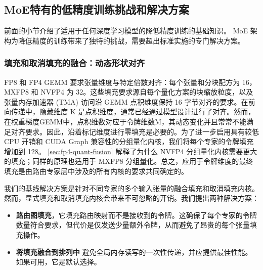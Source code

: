 \documentclass[10pt,logo,copyright]{nvidiatechreport_zh}
\begin{document}
\subsection{MoE特有的低精度训练挑战和解决方案}

前面的小节介绍了适用于任何深度学习模型的降低精度训练的基础知识。 MoE 架构为降低精度的训练带来了独特的挑战，需要超出标准实施的专门解决方案。

\subsubsection{填充和取消填充的融合：动态形状对齐}
FP8 和 FP4 GEMM 要求张量维度与特定倍数对齐：每个张量和分块配方为 16，MXFP8 和 NVFP4 为 32。这些填充要求源自每个量化方案的块缩放粒度，以及张量内存加速器 (TMA) 访问沿 GEMM 点积维度保持 16 字节对齐的要求。在前向传递中，隐藏维度 K 是点积维度，通常已经通过模型设计进行了对齐。然而，在权重梯度GEMM中，点积维数对应于令牌维数M，其动态变化并且常常不能满足对齐要求。因此，沿着标记维度进行零填充是必要的。为了进一步启用具有较低 CPU 开销和 CUDA Graph 兼容性的分组量化内核，我们将每个专家的令牌填充增加到 128。 \ref{sec:fp4-quant-fusion} 解释了为什么 NVFP4 分组量化内核需要更大的填充；同样的原理也适用于 MXFP8 分组量化。总之，应用于令牌维度的最终填充是由路由专家层中涉及的所有内核的要求共同确定的。

我们的基线解决方案是针对不同专家的多个输入张量的融合填充和取消填充内核。然而，显式填充和取消填充内核会带来不可忽略的开销。我们提出两种解决方案：
\begin{itemize}
    \item \textbf{路由图填充}，它填充路由映射而不是接收到的令牌。这确保了每个专家的令牌数量符合要求，但代价是仅发送少量额外令牌，从而避免了昂贵的每个张量填充操作。
    \item \textbf{将填充融合到排列中} 避免全局内存读写的一次性传递，并应提供最佳性能。如果可用，它是默认选择。
\end{itemize}


\end{document}
